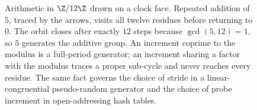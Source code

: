 \begin{figure}[ht]
\centering
{}
\caption{Arithmetic in $\Z/12\Z$ drawn on a clock face. Repeated
addition of $5$, traced by the arrows, visits all twelve residues
before returning to $0$. The orbit closes after exactly $12$ steps
because $\gcd(5, 12) = 1$, so $5$ generates the additive group. An
increment coprime to the modulus is a full-period generator; an
increment sharing a factor with the modulus traces a proper
sub-cycle and never reaches every residue. The same fact governs
the choice of stride in a linear-congruential pseudo-random
generator and the choice of probe increment in open-addressing
hash tables.}
\label{fig:vol02:ch17:modular-clock}
\end{figure}
